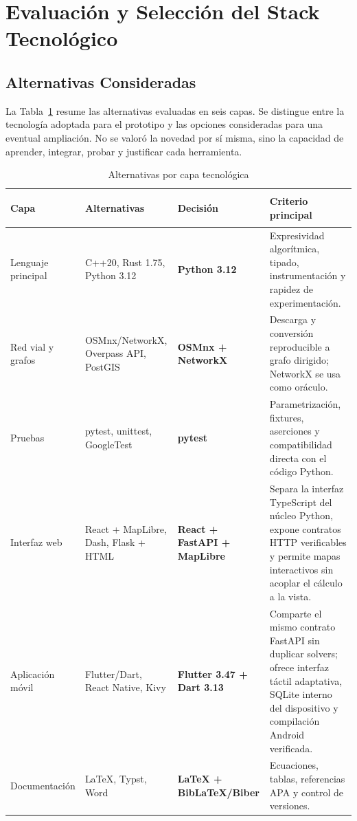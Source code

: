 \section{Evaluación y Selección del Stack Tecnológico}
\label{sec:stack}

\subsection{Alternativas Consideradas}
La Tabla~\ref{tab:alternativas_stack} resume las alternativas evaluadas en seis capas. Se distingue entre la tecnología adoptada para el prototipo y las opciones consideradas para una eventual ampliación. No se valoró la novedad por sí misma, sino la capacidad de aprender, integrar, probar y justificar cada herramienta.

\begin{table}[H]
    \centering
    \fontsize{8.8}{10.5}\selectfont
    \renewcommand{\arraystretch}{1.10}
    \caption{Alternativas por capa tecnológica}
    \label{tab:alternativas_stack}
    \begin{tabularx}{\textwidth}{@{}>{\bfseries\raggedright\arraybackslash}p{2.35cm} >{\raggedright\arraybackslash}p{3.65cm} >{\raggedright\arraybackslash}p{2.55cm} >{\raggedright\arraybackslash}X@{}}
        \toprule
        \textbf{Capa} & \textbf{Alternativas} & \textbf{Decisión} & \textbf{Criterio principal} \\
        \midrule
        Lenguaje principal & C++20, Rust 1.75, Python 3.12 & \textbf{Python 3.12} & Expresividad algorítmica, tipado, instrumentación y rapidez de experimentación. \\
        Red vial y grafos & OSMnx/NetworkX, Overpass API, PostGIS & \textbf{OSMnx + NetworkX} & Descarga y conversión reproducible a grafo dirigido; NetworkX se usa como oráculo. \\
        Pruebas & pytest, unittest, GoogleTest & \textbf{pytest} & Parametrización, fixtures, aserciones y compatibilidad directa con el código Python. \\
        Interfaz web & React + MapLibre, Dash, Flask + HTML & \textbf{React + FastAPI + MapLibre} & Separa la interfaz TypeScript del núcleo Python, expone contratos HTTP verificables y permite mapas interactivos sin acoplar el cálculo a la vista. \\
        Aplicación móvil & Flutter/Dart, React Native, Kivy & \textbf{Flutter 3.47 + Dart 3.13} & Comparte el mismo contrato FastAPI sin duplicar solvers; ofrece interfaz táctil adaptativa, SQLite interno del dispositivo y compilación Android verificada. \\
        Documentación & LaTeX, Typst, Word & \textbf{LaTeX + BibLaTeX/Biber} & Ecuaciones, tablas, referencias APA y control de versiones. \\
        \bottomrule
    \end{tabularx}
\end{table}

